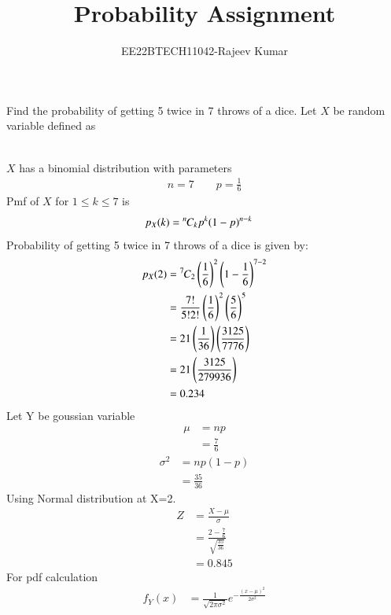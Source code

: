 \documentclass[journal,12pt,twocolumn]{IEEEtran}
\theoremstyle{remark}
\begin{document}

\vspace{3cm}

\title{Probability Assignment}
\author{EE22BTECH11042-Rajeev Kumar
}
\maketitle
\newpage
\bigskip
\renewcommand{\thefigure}{\theenumi}
\renewcommand{\thetable}{\theenumi}

Find the probability of getting 5 twice in 7 throws of a dice.
\solution
Let $X$ be random variable defined as
\begin{table}[!ht]
	
\end{table}\\
$X$ has a binomial distribution with parameters
\begin{align}
n=7 \qquad p=\frac{1}{6}
\end{align}
Pmf of $X$ for $1 \leq k \leq 7$ is
\begin{align}
p_X(k)&={{}^{n}\mkern-1muC_{k}}p^k(1-p)^{n-k}
\end{align}
Probability of getting 5 twice in 7 throws of a dice is given by:
\begin{align}
p_X(2)&={{}^{7}\mkern-1muC_{2}}\left(\frac{1}{6}\right)^2\left(1-\frac{1}{6}\right)^{7-2}\\
&=\frac{7!}{5!2!}\left(\frac{1}{6}\right)^2\left(\frac{5}{6}\right)^{5}\\
&=21\left(\frac{1}{36}\right)\left(\frac{3125}{7776}\right)\\
&=21\left(\frac{3125}{279936}\right)\\
&=0.234\label{eq:9.3.13.1}
\end{align}
Let Y be goussian variable
\begin{align}
\mu&=np\\
&=\frac{7}{6}
\end{align}
\begin{align}
\sigma^2&=np(1-p)\\
&=\frac{35}{36}
\end{align}
Using Normal distribution at X=2.
\begin{align}
Z&=\frac{X-\mu}{\sigma}\\
&=\frac{2-\frac{7}{6}}{\sqrt{\frac{35}{36}}}\\
&=0.845
\end{align}
For pdf calculation
\begin{align}
f_Y(x)&=\frac{1}{\sqrt{2\pi\sigma^2}}e^{-\frac{(x-\mu)^2}{2\sigma^2}}
\end{align}
\end{document}
